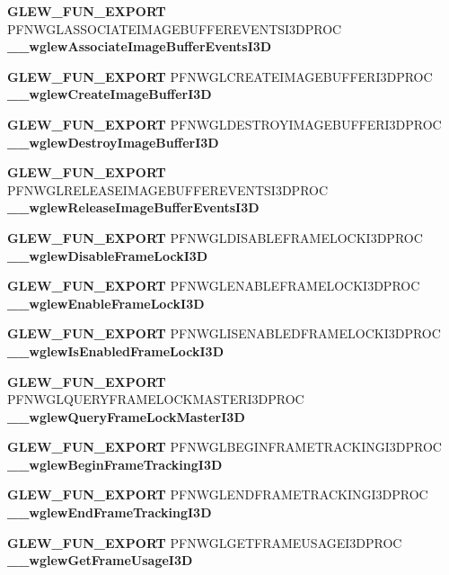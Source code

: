 \begin{DoxyCompactItemize}
\item 
{\bf G\+L\+E\+W\+\_\+\+F\+U\+N\+\_\+\+E\+X\+P\+O\+RT} P\+F\+N\+W\+G\+L\+A\+S\+S\+O\+C\+I\+A\+T\+E\+I\+M\+A\+G\+E\+B\+U\+F\+F\+E\+R\+E\+V\+E\+N\+T\+S\+I3\+D\+P\+R\+OC {\bf \+\_\+\+\_\+wglew\+Associate\+Image\+Buffer\+Events\+I3D}
\item 
{\bf G\+L\+E\+W\+\_\+\+F\+U\+N\+\_\+\+E\+X\+P\+O\+RT} P\+F\+N\+W\+G\+L\+C\+R\+E\+A\+T\+E\+I\+M\+A\+G\+E\+B\+U\+F\+F\+E\+R\+I3\+D\+P\+R\+OC {\bf \+\_\+\+\_\+wglew\+Create\+Image\+Buffer\+I3D}
\item 
{\bf G\+L\+E\+W\+\_\+\+F\+U\+N\+\_\+\+E\+X\+P\+O\+RT} P\+F\+N\+W\+G\+L\+D\+E\+S\+T\+R\+O\+Y\+I\+M\+A\+G\+E\+B\+U\+F\+F\+E\+R\+I3\+D\+P\+R\+OC {\bf \+\_\+\+\_\+wglew\+Destroy\+Image\+Buffer\+I3D}
\item 
{\bf G\+L\+E\+W\+\_\+\+F\+U\+N\+\_\+\+E\+X\+P\+O\+RT} P\+F\+N\+W\+G\+L\+R\+E\+L\+E\+A\+S\+E\+I\+M\+A\+G\+E\+B\+U\+F\+F\+E\+R\+E\+V\+E\+N\+T\+S\+I3\+D\+P\+R\+OC {\bf \+\_\+\+\_\+wglew\+Release\+Image\+Buffer\+Events\+I3D}
\item 
{\bf G\+L\+E\+W\+\_\+\+F\+U\+N\+\_\+\+E\+X\+P\+O\+RT} P\+F\+N\+W\+G\+L\+D\+I\+S\+A\+B\+L\+E\+F\+R\+A\+M\+E\+L\+O\+C\+K\+I3\+D\+P\+R\+OC {\bf \+\_\+\+\_\+wglew\+Disable\+Frame\+Lock\+I3D}
\item 
{\bf G\+L\+E\+W\+\_\+\+F\+U\+N\+\_\+\+E\+X\+P\+O\+RT} P\+F\+N\+W\+G\+L\+E\+N\+A\+B\+L\+E\+F\+R\+A\+M\+E\+L\+O\+C\+K\+I3\+D\+P\+R\+OC {\bf \+\_\+\+\_\+wglew\+Enable\+Frame\+Lock\+I3D}
\item 
{\bf G\+L\+E\+W\+\_\+\+F\+U\+N\+\_\+\+E\+X\+P\+O\+RT} P\+F\+N\+W\+G\+L\+I\+S\+E\+N\+A\+B\+L\+E\+D\+F\+R\+A\+M\+E\+L\+O\+C\+K\+I3\+D\+P\+R\+OC {\bf \+\_\+\+\_\+wglew\+Is\+Enabled\+Frame\+Lock\+I3D}
\item 
{\bf G\+L\+E\+W\+\_\+\+F\+U\+N\+\_\+\+E\+X\+P\+O\+RT} P\+F\+N\+W\+G\+L\+Q\+U\+E\+R\+Y\+F\+R\+A\+M\+E\+L\+O\+C\+K\+M\+A\+S\+T\+E\+R\+I3\+D\+P\+R\+OC {\bf \+\_\+\+\_\+wglew\+Query\+Frame\+Lock\+Master\+I3D}
\item 
{\bf G\+L\+E\+W\+\_\+\+F\+U\+N\+\_\+\+E\+X\+P\+O\+RT} P\+F\+N\+W\+G\+L\+B\+E\+G\+I\+N\+F\+R\+A\+M\+E\+T\+R\+A\+C\+K\+I\+N\+G\+I3\+D\+P\+R\+OC {\bf \+\_\+\+\_\+wglew\+Begin\+Frame\+Tracking\+I3D}
\item 
{\bf G\+L\+E\+W\+\_\+\+F\+U\+N\+\_\+\+E\+X\+P\+O\+RT} P\+F\+N\+W\+G\+L\+E\+N\+D\+F\+R\+A\+M\+E\+T\+R\+A\+C\+K\+I\+N\+G\+I3\+D\+P\+R\+OC {\bf \+\_\+\+\_\+wglew\+End\+Frame\+Tracking\+I3D}
\item 
{\bf G\+L\+E\+W\+\_\+\+F\+U\+N\+\_\+\+E\+X\+P\+O\+RT} P\+F\+N\+W\+G\+L\+G\+E\+T\+F\+R\+A\+M\+E\+U\+S\+A\+G\+E\+I3\+D\+P\+R\+OC {\bf \+\_\+\+\_\+wglew\+Get\+Frame\+Usage\+I3D}

\end{DoxyCompactItemize}
